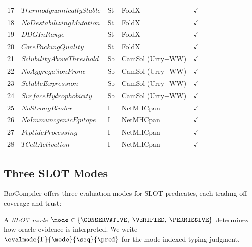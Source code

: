\begin{table}[t]
\begin{tabular}{clllc}
\midrule
17 & $\mathit{ThermodynamicallyStable}$ & St & FoldX                & $\checkmark$ \\
18 & $\mathit{NoDestabilizingMutation}$ & St & FoldX                & $\checkmark$ \\
19 & $\mathit{DDGInRange}$            & St  & FoldX                 & $\checkmark$ \\
20 & $\mathit{CorePackingQuality}$    & St  & FoldX                 & $\checkmark$ \\
\midrule
21 & $\mathit{SolubilityAboveThreshold}$ & So & CamSol (Urry+WW)   & $\checkmark$ \\
22 & $\mathit{NoAggregationProne}$    & So  & CamSol (Urry+WW)     & $\checkmark$ \\
23 & $\mathit{SolubleExpression}$     & So  & CamSol (Urry+WW)     & $\checkmark$ \\
24 & $\mathit{SurfaceHydrophobicity}$ & So  & CamSol (Urry+WW)     & $\checkmark$ \\
\midrule
25 & $\mathit{NoStrongBinder}$        & I   & NetMHCpan             & $\checkmark$ \\
26 & $\mathit{NoImmunogenicEpitope}$  & I   & NetMHCpan             & $\checkmark$ \\
27 & $\mathit{PeptideProcessing}$     & I   & NetMHCpan             & $\checkmark$ \\
28 & $\mathit{TCellActivation}$       & I   & NetMHCpan             & $\checkmark$ \\
\bottomrule
\end{tabular}
\end{table}

\subsection{Three SLOT Modes}\label{sec:slot-modes}

BioCompiler offers three evaluation modes for SLOT predicates, each
trading off coverage and trust:

\begin{definition}
A \emph{SLOT mode} $\mode \in \{\CONSERVATIVE,\; \VERIFIED,\;
\PERMISSIVE\}$ determines how oracle evidence is interpreted.
We write $\evalmode{\Gamma}{\mode}{\seq}{\pred}$ for the mode-indexed
typing judgment.
\end{definition}

